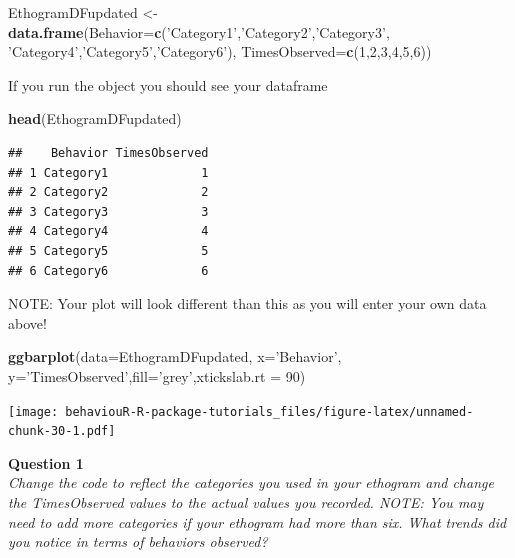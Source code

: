 \documentclass[]{book}
\newenvironment{Shaded}{\begin{snugshade}}{\end{snugshade}}
\newcommand{\DataTypeTok}[1]{\textcolor[rgb]{0.13,0.29,0.53}{#1}}
\newcommand{\DecValTok}[1]{\textcolor[rgb]{0.00,0.00,0.81}{#1}}
\newcommand{\KeywordTok}[1]{\textcolor[rgb]{0.13,0.29,0.53}{\textbf{#1}}}
\newcommand{\NormalTok}[1]{#1}
\newcommand{\StringTok}[1]{\textcolor[rgb]{0.31,0.60,0.02}{#1}}
\begin{document}
\begin{Shaded}
\begin{Highlighting}[]
\NormalTok{EthogramDFupdated <-}\StringTok{ }\KeywordTok{data.frame}\NormalTok{(}\DataTypeTok{Behavior=}\KeywordTok{c}\NormalTok{(}\StringTok{'Category1'}\NormalTok{,}\StringTok{'Category2'}\NormalTok{,}\StringTok{'Category3'}\NormalTok{,}
                                           \StringTok{'Category4'}\NormalTok{,}\StringTok{'Category5'}\NormalTok{,}\StringTok{'Category6'}\NormalTok{),}
                         \DataTypeTok{TimesObserved=}\KeywordTok{c}\NormalTok{(}\DecValTok{1}\NormalTok{,}\DecValTok{2}\NormalTok{,}\DecValTok{3}\NormalTok{,}\DecValTok{4}\NormalTok{,}\DecValTok{5}\NormalTok{,}\DecValTok{6}\NormalTok{))}
\end{Highlighting}
\end{Shaded}

If you run the object you should see your dataframe

\begin{Shaded}
\begin{Highlighting}[]
\KeywordTok{head}\NormalTok{(EthogramDFupdated)}
\end{Highlighting}
\end{Shaded}

\begin{verbatim}
##    Behavior TimesObserved
## 1 Category1             1
## 2 Category2             2
## 3 Category3             3
## 4 Category4             4
## 5 Category5             5
## 6 Category6             6
\end{verbatim}

NOTE: Your plot will look different than this as you will enter your own data above!

\begin{Shaded}
\begin{Highlighting}[]
\KeywordTok{ggbarplot}\NormalTok{(}\DataTypeTok{data=}\NormalTok{EthogramDFupdated, }\DataTypeTok{x=}\StringTok{'Behavior'}\NormalTok{, }\DataTypeTok{y=}\StringTok{'TimesObserved'}\NormalTok{,}\DataTypeTok{fill=}\StringTok{'grey'}\NormalTok{,}\DataTypeTok{xtickslab.rt =} \DecValTok{90}\NormalTok{)}
\end{Highlighting}
\end{Shaded}

\texttt{[image: behaviouR-R-package-tutorials\_files/figure-latex/unnamed-chunk-30-1.pdf]}

\textbf{Question 1}\\
\emph{Change the code to reflect the categories you used in your ethogram and change the TimesObserved values to the actual values you recorded. NOTE: You may need to add more categories if your ethogram had more than six. What trends did you notice in terms of behaviors observed?}
\end{document}
